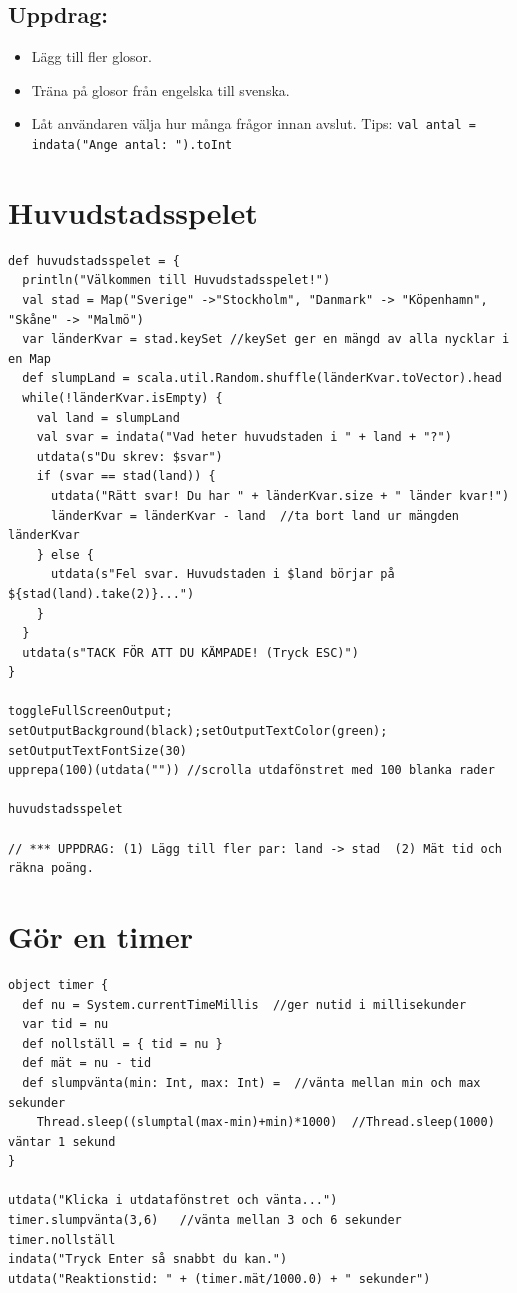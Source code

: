 \section*{\color{BrickRed}Uppdrag:}


\begin{itemize}

\item {Lägg till fler glosor.}
\item {Träna på glosor från engelska till svenska.}
\item {Låt användaren välja hur många frågor innan avslut. Tips: \lstinline{val antal = indata("Ange antal: ").toInt}}

\end{itemize}


\chapter{Huvudstadsspelet}
\begin{lstlisting}[basicstyle={\ttfamily\fontsize{13}{16}\selectfont},numbers=none]
def huvudstadsspelet = {
  println("Välkommen till Huvudstadsspelet!")
  val stad = Map("Sverige" ->"Stockholm", "Danmark" -> "Köpenhamn", "Skåne" -> "Malmö")
  var länderKvar = stad.keySet //keySet ger en mängd av alla nycklar i en Map 
  def slumpLand = scala.util.Random.shuffle(länderKvar.toVector).head
  while(!länderKvar.isEmpty) {
    val land = slumpLand
    val svar = indata("Vad heter huvudstaden i " + land + "?")
    utdata(s"Du skrev: $svar")
    if (svar == stad(land)) {
      utdata("Rätt svar! Du har " + länderKvar.size + " länder kvar!")
      länderKvar = länderKvar - land  //ta bort land ur mängden länderKvar
    } else {
      utdata(s"Fel svar. Huvudstaden i $land börjar på ${stad(land).take(2)}...")
    }
  }
  utdata(s"TACK FÖR ATT DU KÄMPADE! (Tryck ESC)")
}

toggleFullScreenOutput;  
setOutputBackground(black);setOutputTextColor(green); setOutputTextFontSize(30)
upprepa(100)(utdata("")) //scrolla utdafönstret med 100 blanka rader

huvudstadsspelet

// *** UPPDRAG: (1) Lägg till fler par: land -> stad  (2) Mät tid och räkna poäng.
\end{lstlisting}
        
\chapter{Gör en timer}
\begin{lstlisting}[basicstyle={\ttfamily\fontsize{14}{17}\selectfont},numbers=none]
object timer {
  def nu = System.currentTimeMillis  //ger nutid i millisekunder
  var tid = nu
  def nollställ = { tid = nu }
  def mät = nu - tid
  def slumpvänta(min: Int, max: Int) =  //vänta mellan min och max sekunder
    Thread.sleep((slumptal(max-min)+min)*1000)  //Thread.sleep(1000) väntar 1 sekund
}

utdata("Klicka i utdatafönstret och vänta...")
timer.slumpvänta(3,6)   //vänta mellan 3 och 6 sekunder
timer.nollställ
indata("Tryck Enter så snabbt du kan.")
utdata("Reaktionstid: " + (timer.mät/1000.0) + " sekunder")
\end{lstlisting}
        
